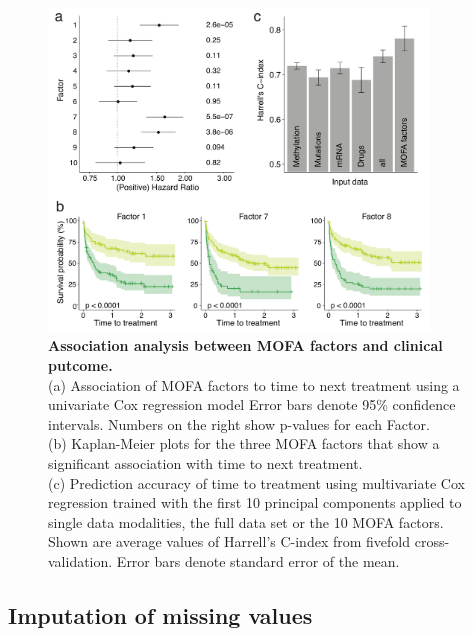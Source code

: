 \begin{figure}[H]
	\centering 	
	\includegraphics[width=0.9\textwidth]{MOFA_CLL_Cox}
	\caption{
	\textbf{Association analysis between MOFA factors and clinical putcome.}\\
	(a) Association of MOFA factors to time to next treatment using a univariate Cox regression model Error bars denote 95\% confidence intervals. Numbers on the right show p-values for each Factor.\\
	(b) Kaplan-Meier plots for the three MOFA factors that show a significant association with time to next treatment.\\
	(c) Prediction accuracy of time to treatment using multivariate Cox regression trained with the first 10 principal components applied to single data modalities, the full data set or the 10 MOFA factors. Shown are average values of Harrell's C-index from fivefold cross-validation. Error bars denote standard error of the mean.
	}
	\label{fig:MOFA_CLL_Cox}
\end{figure}


\subsection{Imputation of missing values}

